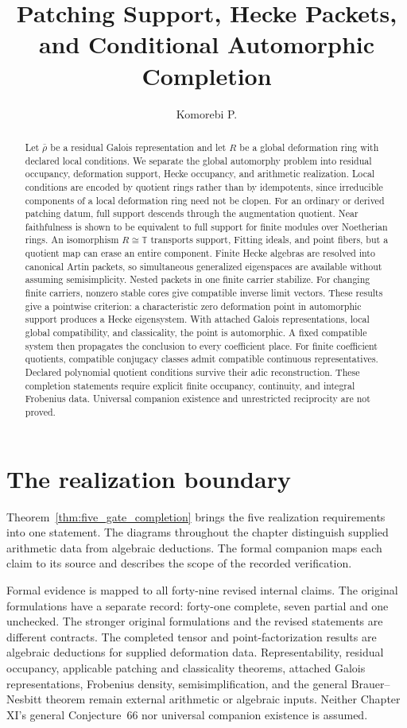 \documentclass[11pt]{amsart}
\title[Patching support and automorphic completion]{Patching Support, Hecke Packets, and Conditional Automorphic Completion}
\author[Komorebi P.]{Komorebi P.}
\date{}
\theoremstyle{definition}
\theoremstyle{remark}
\newcommand{\TT}{\mathbb T}
\begin{document}
\KomorebiCover


\begin{abstract}
Let \(\bar\rho\) be a residual Galois representation and let \(R\) be a global deformation ring with declared local conditions. We separate the global automorphy problem into residual occupancy, deformation support, Hecke occupancy, and arithmetic realization. Local conditions are encoded by quotient rings rather than by idempotents, since irreducible components of a local deformation ring need not be clopen. For an ordinary or derived patching datum, full support descends through the augmentation quotient. Near faithfulness is shown to be equivalent to full support for finite modules over Noetherian rings. An isomorphism \(R\cong\TT\) transports support, Fitting ideals, and point fibers, but a quotient map can erase an entire component. Finite Hecke algebras are resolved into canonical Artin packets, so simultaneous generalized eigenspaces are available without assuming semisimplicity. Nested packets in one finite carrier stabilize. For changing finite carriers, nonzero stable cores give compatible inverse limit vectors. These results give a pointwise criterion: a characteristic zero deformation point in automorphic support produces a Hecke eigensystem. With attached Galois representations, local global compatibility, and classicality, the point is automorphic. A fixed compatible system then propagates the conclusion to every coefficient place. For finite coefficient quotients, compatible conjugacy classes admit compatible continuous representatives. Declared polynomial quotient conditions survive their adic reconstruction. These completion statements require explicit finite occupancy, continuity, and integral Frobenius data. Universal companion existence and unrestricted reciprocity are not proved.
\end{abstract}
\makeatletter\@setabstract\makeatother
\thispagestyle{plain}

\section*{The realization boundary}
Theorem~\ref{thm:five_gate_completion} brings the five realization requirements into one statement. The diagrams throughout the chapter distinguish supplied arithmetic data from algebraic deductions. The formal companion maps each claim to its source and describes the scope of the recorded verification.

Formal evidence is mapped to all forty-nine revised internal claims. The original formulations have a separate record: forty-one complete, seven partial and one unchecked. The stronger original formulations and the revised statements are different contracts. The completed tensor and point-factorization results are algebraic deductions for supplied deformation data. Representability, residual occupancy, applicable patching and classicality theorems, attached Galois representations, Frobenius density, semisimplification, and the general Brauer--Nesbitt theorem remain external arithmetic or algebraic inputs. Neither Chapter XI's general Conjecture~66 nor universal companion existence is assumed.
\end{document}
